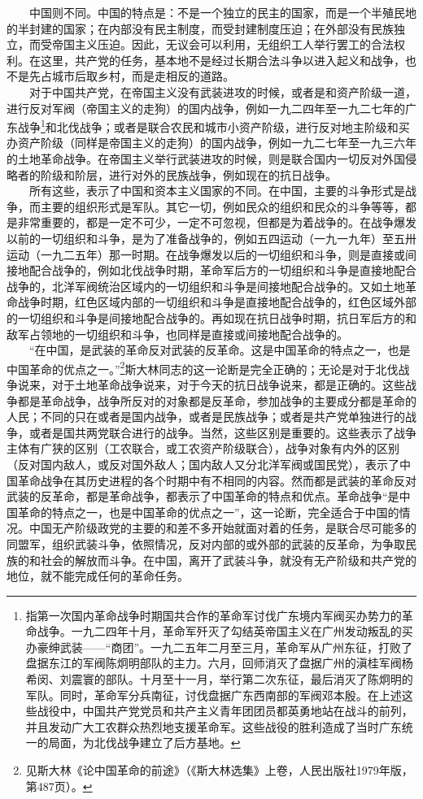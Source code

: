 \documentclass[cn,11pt,chinese]{elegantbook}
\begin{document}
　　中国则不同。中国的特点是：不是一个独立的民主的国家，而是一个半殖民地的半封建的国家；在内部没有民主制度，而受封建制度压迫；在外部没有民族独立，而受帝国主义压迫。因此，无议会可以利用，无组织工人举行罢工的合法权利。在这里，共产党的任务，基本地不是经过长期合法斗争以进入起义和战争，也不是先占城市后取乡村，而是走相反的道路。\\
　　对于中国共产党，在帝国主义没有武装进攻的时候，或者是和资产阶级一道，进行反对军阀（帝国主义的走狗）的国内战争，例如一九二四年至一九二七年的广东战争\footnote[2]{ 指第一次国内革命战争时期国共合作的革命军讨伐广东境内军阀买办势力的革命战争。一九二四年十月，革命军歼灭了勾结英帝国主义在广州发动叛乱的买办豪绅武装——“商团”。一九二五年二月至三月，革命军从广州东征，打败了盘据东江的军阀陈炯明部队的主力。六月，回师消灭了盘据广州的滇桂军阀杨希闵、刘震寰的部队。十月至十一月，举行第二次东征，最后消灭了陈炯明的军队。同时，革命军分兵南征，讨伐盘据广东西南部的军阀邓本殷。在上述这些战役中，中国共产党党员和共产主义青年团团员都英勇地站在战斗的前列，并且发动广大工农群众热烈地支援革命军。这些战役的胜利造成了当时广东统一的局面，为北伐战争建立了后方基地。}和北伐战争；或者是联合农民和城市小资产阶级，进行反对地主阶级和买办资产阶级（同样是帝国主义的走狗）的国内战争，例如一九二七年至一九三六年的土地革命战争。在帝国主义举行武装进攻的时候，则是联合国内一切反对外国侵略者的阶级和阶层，进行对外的民族战争，例如现在的抗日战争。\\
　　所有这些，表示了中国和资本主义国家的不同。在中国，主要的斗争形式是战争，而主要的组织形式是军队。其它一切，例如民众的组织和民众的斗争等等，都是非常重要的，都是一定不可少，一定不可忽视，但都是为着战争的。在战争爆发以前的一切组织和斗争，是为了准备战争的，例如五四运动（一九一九年）至五卅运动（一九二五年）那一时期。在战争爆发以后的一切组织和斗争，则是直接或间接地配合战争的，例如北伐战争时期，革命军后方的一切组织和斗争是直接地配合战争的，北洋军阀统治区域内的一切组织和斗争是间接地配合战争的。又如土地革命战争时期，红色区域内部的一切组织和斗争是直接地配合战争的，红色区域外部的一切组织和斗争是间接地配合战争的。再如现在抗日战争时期，抗日军后方的和敌军占领地的一切组织和斗争，也同样是直接或间接地配合战争的。\\
　　“在中国，是武装的革命反对武装的反革命。这是中国革命的特点之一，也是中国革命的优点之一。”\footnote[3]{ 见斯大林《论中国革命的前途》（《斯大林选集》上卷，人民出版社1979年版，第487页）。}斯大林同志的这一论断是完全正确的；无论是对于北伐战争说来，对于土地革命战争说来，对于今天的抗日战争说来，都是正确的。这些战争都是革命战争，战争所反对的对象都是反革命，参加战争的主要成分都是革命的人民；不同的只在或者是国内战争，或者是民族战争；或者是共产党单独进行的战争，或者是国共两党联合进行的战争。当然，这些区别是重要的。这些表示了战争主体有广狭的区别（工农联合，或工农资产阶级联合），战争对象有内外的区别（反对国内敌人，或反对国外敌人；国内敌人又分北洋军阀或国民党），表示了中国革命战争在其历史进程的各个时期中有不相同的内容。然而都是武装的革命反对武装的反革命，都是革命战争，都表示了中国革命的特点和优点。革命战争“是中国革命的特点之一，也是中国革命的优点之一”，这一论断，完全适合于中国的情况。中国无产阶级政党的主要的和差不多开始就面对着的任务，是联合尽可能多的同盟军，组织武装斗争，依照情况，反对内部的或外部的武装的反革命，为争取民族的和社会的解放而斗争。在中国，离开了武装斗争，就没有无产阶级和共产党的地位，就不能完成任何的革命任务。\\
\end{document}
